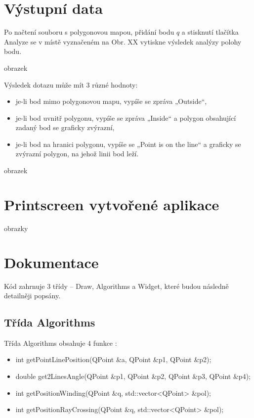 \documentclass[11pt]{article}
\begin{document}

\section{Výstupní data}

Po načtení souboru s polygonovou mapou, přidání bodu $q$ a stisknutí tlačítka Analyze se v místě vyznačeném na Obr.  XX vytiskne výsledek analýzy polohy bodu. 

obrazek

Výsledek dotazu může mít 3 různé hodnoty:

\begin{itemize}
\item je-li bod mimo polygonovou mapu, vypíše se zpráva „Outside“,
\item je-li bod uvnitř polygonu, vypíše se zpráva „Inside“ a polygon obsahující zadaný bod se graficky zvýrazní,
\item je-li bod na hranici polygonu, vypíše se „Point is on the line“ a graficky se zvýrazní polygon, na jehož linii bod leží.      
\end{itemize}

obrazek
\clearpage

\section{Printscreen vytvořené aplikace}
obrazky


\section{Dokumentace}
Kód zahrnuje 3 třídy – Draw, Algorithms a Widget, které budou následně detailněji popsány.      

\subsection{Třída Algorithms}
Třída Algorithms obsahuje 4 funkce :  

\begin{itemize}
\item int getPointLinePosition(QPoint \&a, QPoint \&p1, QPoint \&p2);
\item double get2LinesAngle(QPoint \&p1, QPoint \&p2, QPoint \&p3, QPoint \&p4);
\item int getPositionWinding(QPoint \&q, std::vector<QPoint> \&pol);
\item int getPositionRayCrossing(QPoint \&q, std::vector<QPoint> \&pol);
\end{itemize}
\end{document}
